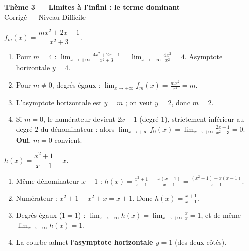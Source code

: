 \documentclass[11pt,a4paper]{article}
\begin{document}
\begin{center}
{\Large\bfseries\color{primarydark}Thème 3 — Limites à l'infini : le terme dominant}\\[2pt]
{\large\color{excol}Corrigé — Niveau Difficile}
\end{center}
\vspace{6pt}

\begin{correction}
$f_m(x)=\dfrac{m x^2+2x-1}{x^2+3}$.
\begin{enumerate}[label=\alph*),leftmargin=2em,itemsep=3pt]
  \item Pour $m=4$ : $\displaystyle\lim_{x\to+\infty}\frac{4x^2+2x-1}{x^2+3}=\lim_{x\to+\infty}\frac{4x^2}{x^2}=4$.
        Asymptote horizontale $y=4$.
  \item Pour $m\neq 0$, degrés égaux : $\displaystyle\lim_{x\to+\infty} f_m(x)=\frac{m x^2}{x^2}=m$.
  \item L'asymptote horizontale est $y=m$ ; on veut $y=2$, donc $\boxed{m=2}$.
  \item Si $m=0$, le numérateur devient $2x-1$ (degré $1$), strictement inférieur au degré $2$ du
        dénominateur : alors $\displaystyle\lim_{x\to+\infty} f_0(x)=\lim_{x\to+\infty}\frac{2x-1}{x^2+3}=0$.
        \textbf{Oui}, $m=0$ convient.
\end{enumerate}
\end{correction}

\begin{correction}
$h(x)=\dfrac{x^2+1}{x-1}-x$.
\begin{enumerate}[label=\alph*),leftmargin=2em,itemsep=3pt]
  \item Même dénominateur $x-1$ : $\displaystyle h(x)=\frac{x^2+1}{x-1}-\frac{x(x-1)}{x-1}=\frac{(x^2+1)-x(x-1)}{x-1}$.
  \item Numérateur : $x^2+1-x^2+x=x+1$. Donc $\displaystyle h(x)=\frac{x+1}{x-1}$.
  \item Degrés égaux ($1=1$) : $\displaystyle\lim_{x\to+\infty} h(x)=\lim_{x\to+\infty}\frac{x}{x}=1$, et de même
        $\displaystyle\lim_{x\to-\infty} h(x)=1$.
  \item La courbe admet l'\textbf{asymptote horizontale $y=1$} (des deux côtés).
\end{enumerate}
\end{correction}
\end{document}
